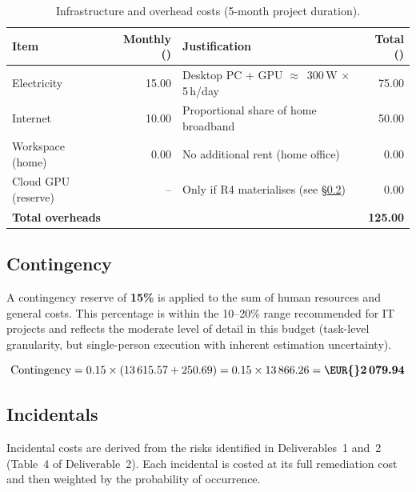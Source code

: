\documentclass[11pt, a4paper]{article}
\begin{document}
\begin{table}[h!]
    \centering
    \caption{Infrastructure and overhead costs (5-month project duration).}
    \label{tab:overheads}
    \renewcommand{\arraystretch}{1.1}
    \begin{tabularx}{\linewidth}{l r l r}
        \toprule
        \textbf{Item} & \textbf{Monthly (\EUR{})} & \textbf{Justification} & \textbf{Total (\EUR{})} \\
        \midrule
        Electricity      & 15.00  & Desktop PC + GPU $\approx$~300\,W $\times$ 5\,h/day  & 75.00 \\
        Internet          & 10.00  & Proportional share of home broadband     & 50.00 \\
        Workspace (home)  & 0.00   & No additional rent (home office)         & 0.00 \\
        Cloud GPU (reserve) & --   & Only if R4 materialises (see \S\ref{sec:incidentals}) & 0.00 \\
        \midrule
        \multicolumn{3}{l}{\textbf{Total overheads}} & \textbf{125.00} \\
        \bottomrule
    \end{tabularx}
\end{table}

\subsection{Contingency}
\label{sec:contingency}

A contingency reserve of \textbf{15\%} is applied to the sum of human resources and general costs. This percentage is within the 10--20\% range recommended for IT projects and reflects the moderate level of detail in this budget (task-level granularity, but single-person execution with inherent estimation uncertainty).

\[
    \text{Contingency} = 0.15 \times (13\,615.57 + 250.69) = 0.15 \times 13\,866.26 = \textbf{\EUR{}2\,079.94}
\]

\subsection{Incidentals}
\label{sec:incidentals}

Incidental costs are derived from the risks identified in Deliverables~1 and~2 (Table~4 of Deliverable~2). Each incidental is costed at its full remediation cost and then weighted by the probability of occurrence.
\end{document}
